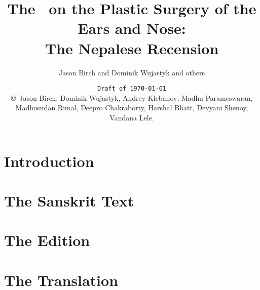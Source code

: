 \documentclass[12pt,draft]{article} %
\title{The \SS\ on the Plastic Surgery of the Ears and Nose:\\ The Nepalese 
Recension}
\author{Jason Birch and Dominik Wujastyk and others}
\date{\texttt{Draft of \today}\\ \copyright\ Jason Birch,
    Dominik Wujastyk,
Andrey Klebanov, 
Madhu Parameswaran,
Madhusudan Rimal, 
Deepro Chakraborty,
Harshal Bhatt, 
Devyani Shenoy,
Vandana Lele.}
\begin{document}
 
    
    
    \pagecolor{cyan}
  
    \maketitle
    \pagecolor{white}
%     
    \tableofcontents
\newpage
    \section{Introduction}
\newpage
    \section{The Sanskrit Text}
\newpage
    \section{The Edition}
\newpage
    \section{The Translation}
\newpage
%    
    
    
\end{document}
